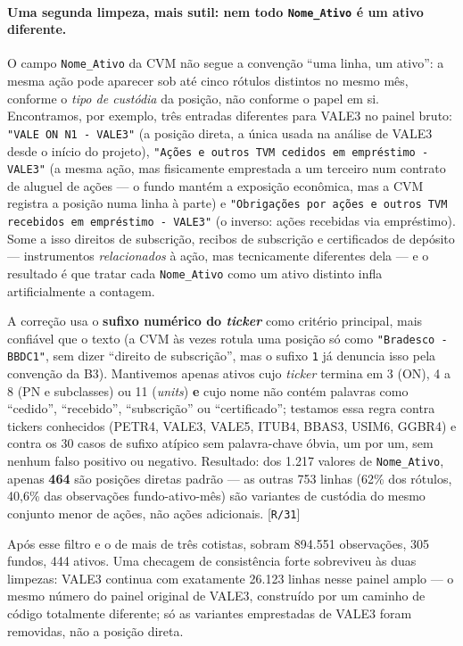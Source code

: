 \documentclass[11pt,a4paper]{article}
\newcommand{\scriptref}[1]{{\footnotesize\color{cinza}[\texttt{#1}]}}
\begin{document}
\paragraph{Uma segunda limpeza, mais sutil: nem todo \texttt{Nome\_Ativo} é um ativo diferente.}
O campo \texttt{Nome\_Ativo} da CVM não segue a convenção ``uma linha, um ativo'': a mesma ação
pode aparecer sob até cinco rótulos distintos no mesmo mês, conforme o \emph{tipo de custódia} da
posição, não conforme o papel em si. Encontramos, por exemplo, três entradas diferentes para
VALE3 no painel bruto: \texttt{"VALE ON N1 - VALE3"} (a posição direta, a única usada na análise
de VALE3 desde o início do projeto), \texttt{"Ações e outros TVM cedidos em empréstimo -
VALE3"} (a mesma ação, mas fisicamente emprestada a um terceiro num contrato de aluguel de
ações --- o fundo mantém a exposição econômica, mas a CVM registra a posição numa linha à
parte) e \texttt{"Obrigações por ações e outros TVM recebidos em empréstimo - VALE3"} (o
inverso: ações recebidas via empréstimo). Some a isso direitos de subscrição, recibos de
subscrição e certificados de depósito --- instrumentos \emph{relacionados} à ação, mas
tecnicamente diferentes dela --- e o resultado é que tratar cada \texttt{Nome\_Ativo} como um
ativo distinto infla artificialmente a contagem.

A correção usa o \textbf{sufixo numérico do \emph{ticker}} como critério principal, mais
confiável que o texto (a CVM às vezes rotula uma posição só como \texttt{"Bradesco - BBDC1"},
sem dizer ``direito de subscrição'', mas o sufixo \texttt{1} já denuncia isso pela convenção da
B3). Mantivemos apenas ativos cujo \emph{ticker} termina em 3 (ON), 4 a 8 (PN e subclasses) ou 11
(\emph{units}) \textbf{e} cujo nome não contém palavras como ``cedido'', ``recebido'',
``subscrição'' ou ``certificado''; testamos essa regra contra tickers conhecidos (PETR4, VALE3,
VALE5, ITUB4, BBAS3, USIM6, GGBR4) e contra os 30 casos de sufixo atípico sem palavra-chave
óbvia, um por um, sem nenhum falso positivo ou negativo. Resultado: dos 1.217 valores de
\texttt{Nome\_Ativo}, apenas \textbf{464} são posições diretas padrão --- as outras 753 linhas
(62\% dos rótulos, 40,6\% das observações fundo-ativo-mês) são variantes de custódia do mesmo
conjunto menor de ações, não ações adicionais. \scriptref{R/31}

Após esse filtro e o de mais de três cotistas, sobram 894.551 observações, 305 fundos, 444
ativos. Uma checagem de consistência forte sobreviveu às duas limpezas: VALE3 continua com
exatamente 26.123 linhas nesse painel amplo --- o mesmo número do painel original de VALE3,
construído por um caminho de código totalmente diferente; só as variantes emprestadas de VALE3
foram removidas, não a posição direta.
\end{document}
